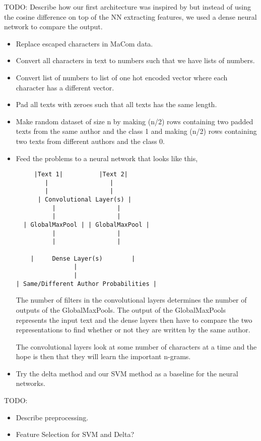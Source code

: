 TODO: Describe how our first architecture was inspired by \cite{qian:2018} but
instead of using the cosine difference on top of the NN extracting features, we
used a dense neural network to compare the output.

\begin{itemize}
    \item Replace escaped characters in MaCom data.
    \item Convert all characters in text to numbers such that we have lists of
        numbers.
    \item Convert list of numbers to list of one hot encoded vector where each
        character has a different vector.
    \item Pad all texts with zeroes such that all texts has the same length.
    \item Make random dataset of size n by making (n/2) rows containing two
        padded texts from the same author and the class 1 and making (n/2) rows
        containing two texts from different authors and the class 0.
    \item Feed the problems to a neural network that looks like this,

        \begin{lstlisting}
     |Text 1|          |Text 2|
        |                 |
        |                 |
      | Convolutional Layer(s) |
          |                 |
          |                 |
  | GlobalMaxPool | | GlobalMaxPool |
          |                 |
          |                 |

    |     Dense Layer(s)        |
                |
                |
| Same/Different Author Probabilities |
        \end{lstlisting}

        The number of filters in the convolutional layers determines the number
        of outputs of the GlobalMaxPools. The output of the GlobalMaxPools
        represents the input text and the dense layers then have to compare the
        two representations to find whether or not they are written by the same
        author.

        The convolutional layers look at some number of characters at a time and
        the hope is then that they will learn the important n-grams.

    \item Try the delta method and our SVM method as a baseline for the neural
        networks.

\end{itemize}

TODO:

\begin{itemize}
    \item Describe preprocessing.
    \item Feature Selection for SVM and Delta?
\end{itemize}
